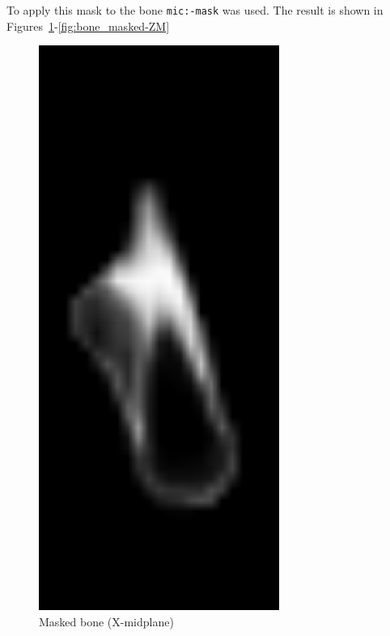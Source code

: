 \documentclass[a4paper,12pt]{article}
\begin{document}
    To apply this mask to the bone \texttt{mic:-mask} was used.
    The result is shown in Figures~\ref{fig:bone_masked-XM}-\ref{fig:bone_masked-ZM}

    \begin{figure}[htbp]
        \centering
        \begin{minipage}[b]{0.3\textwidth}
            \includegraphics[width=0.7\textwidth]{bone_masked-XM}
            \caption{Masked bone (X-midplane)}
            \label{fig:bone_masked-XM}
        \end{minipage}
        \hfill
        \begin{minipage}[b]{0.3\textwidth}

\end{minipage}
\end{figure}
\end{document}
